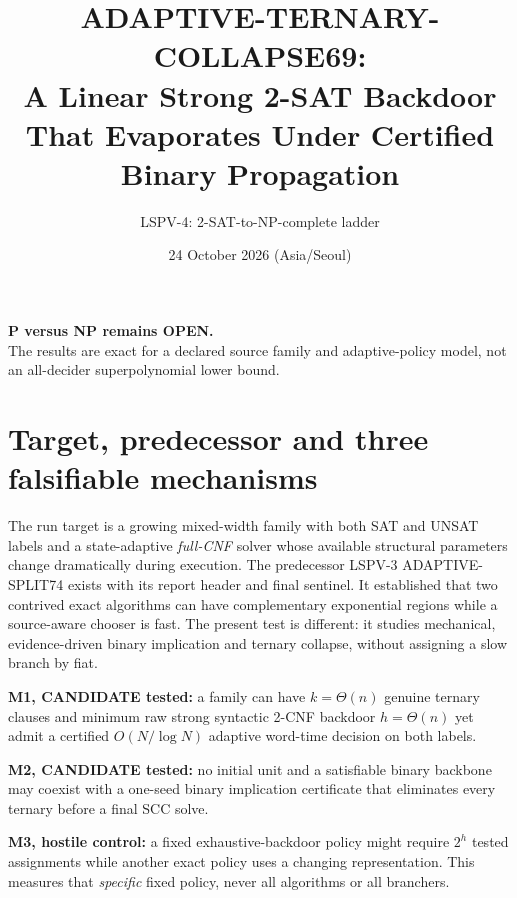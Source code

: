 \documentclass[11pt]{article}
\title{ADAPTIVE-TERNARY-COLLAPSE69:\\
A Linear Strong 2-SAT Backdoor That Evaporates Under Certified Binary Propagation}
\author{LSPV-4: 2-SAT-to-NP-complete ladder}
\date{24 October 2026 (Asia/Seoul)}
\begin{document}
\maketitle
\begin{center}
\textbf{P versus NP remains OPEN.}\\
The results are exact for a declared source family and adaptive-policy model,
not an all-decider superpolynomial lower bound.
\end{center}

\section{Target, predecessor and three falsifiable mechanisms}
The run target is a growing mixed-width family with both SAT and UNSAT labels
and a state-adaptive \emph{full-CNF} solver whose available structural
parameters change dramatically during execution. The predecessor
LSPV-3 ADAPTIVE-SPLIT74 exists with its report header and final sentinel.
It established that two contrived exact algorithms can have complementary
exponential regions while a source-aware chooser is fast. The present
test is different: it studies mechanical, evidence-driven binary
implication and ternary collapse, without assigning a slow branch by fiat.

\noindent\textbf{M1, CANDIDATE tested:} a family can have
$k=\Theta(n)$ genuine ternary clauses and minimum raw strong syntactic
2-CNF backdoor $h=\Theta(n)$ yet admit a certified $O(N/\log N)$
adaptive word-time decision on both labels.

\noindent\textbf{M2, CANDIDATE tested:} no initial unit and a satisfiable
binary backbone may coexist with a one-seed binary implication certificate
that eliminates every ternary before a final SCC solve.

\noindent\textbf{M3, hostile control:} a fixed exhaustive-backdoor policy
might require $2^h$ tested assignments while another exact policy uses a
changing representation. This measures that \emph{specific} fixed policy,
never all algorithms or all branchers.
\end{document}
